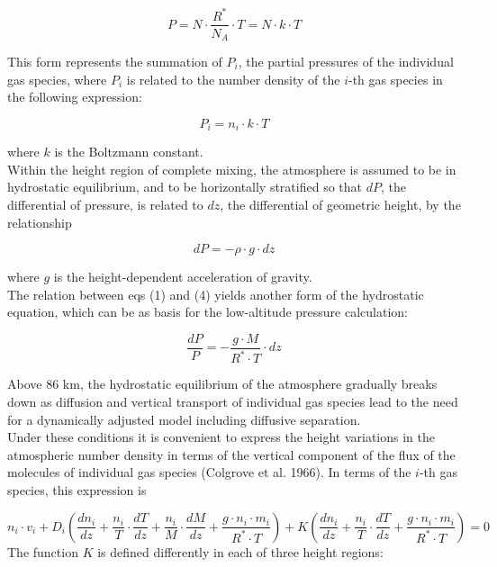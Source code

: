 \documentclass{article}
\begin{document}
\begin{equation}
    P = N \cdot \frac{R^*}{N_A} \cdot T = N \cdot k \cdot T \tag{2}
\end{equation}

This form represents the summation of $P_i$, the partial pressures of the individual gas species, where $P_i$ is related to the number density of the $i$-th gas species in the following expression:

\begin{equation}
    P_i = n_i \cdot k \cdot T \tag{3}
\end{equation}

where $k$ is the Boltzmann constant. \\

Within the height region of complete mixing, the atmosphere is assumed to be in hydrostatic equilibrium, and to be horizontally stratified so that $dP$, the differential of pressure, is related to $dz$, the differential of geometric height, by the relationship

\begin{equation}
    dP = -\rho \cdot g \cdot dz \tag{4}
\end{equation}

where $g$ is the height-dependent acceleration of gravity. \\
The relation between eqs (1) and (4) yields another form of the hydrostatic equation, which can be as basis for the low-altitude pressure calculation:

\begin{equation}
\frac{dP}{P} = -\frac{g \cdot M}{R^* \cdot T} \cdot dz \tag{5}
\end{equation}

Above 86 km, the hydrostatic equilibrium of the atmosphere gradually breaks down as diffusion and vertical transport of individual gas species lead to the need for a dynamically adjusted model including diffusive separation. \\
Under these conditions it is convenient to express the height variations in the atmospheric number density in terms of the vertical component of the flux of the molecules of individual gas species (Colgrove et al. 1966). In terms of the $i$-th gas species, this expression is

\begin{equation}
  n_i \cdot v_i  + D_i \left ( \frac{dn_i}{dz} + \frac{n_i}{T} \cdot \frac{dT}{dz} + \frac{n_i}{M} \cdot \frac{dM}{dz}  + \frac{g \cdot n_i \cdot m_i}{R^* \cdot T}  \right ) + K \left ( \frac{dn_i}{dz} + \frac{n_i}{T} \cdot \frac{dT}{dz}  + \frac{g \cdot n_i \cdot m_i}{R^* \cdot T} \right ) = 0 \tag{6}
\end{equation}
The function $K$ is defined differently in each of three height regions:
\end{document}
